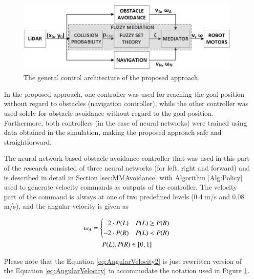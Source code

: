 \begin{figure}
\centering
\includegraphics[width=0.95\columnwidth]{slike/blok.png}
\caption{The general control architecture of the proposed approach.} 
\label{Fig:Blok}
\end{figure}

In the proposed approach, one controller was used for reaching the goal position without regard to obstacles (navigation controller), while the other controller was used solely for obstacle avoidance without regard to the goal position. Furthermore, both controllers (in the case of neural networks) were trained using data obtained in the simulation, making the proposed approach safe and straightforward. 

The neural network-based obstacle avoidance controller that was used in this part of the research consisted of three neural networks (for left, right and forward) and is described in detail in Section \ref{sec:MMAvoidance} with Algorithm \ref{Alg:Policy} used to generate velocity commands as outputs of the controller. The velocity part of the command is always at one of two predefined levels (0.4 m/s and 0.08 m/s), and the angular velocity is given as

\begin{gather}
    \label{eq:AngularVelocity2}
    \omega_A = \begin{cases}
        \hphantom{-}2 \cdot P(L) & P(L) \geq P(R)\\
        -2 \cdot  P(R) & P(L) < P(R)
    \end{cases}\\
    P(L), P(R) \in [0,1] \nonumber
\end{gather}

Please note that the Equation \ref{eq:AngularVelocity2} is just rewritten version of the Equation \ref{eq:AngularVelocity} to accommodate the notation used in Figure \ref{Fig:Blok}.

